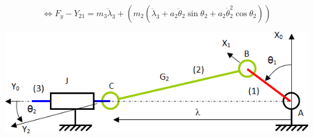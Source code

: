 \documentclass[10pt,fleqn]{article} %
\begin{document}
\begin{multicols}{2}
\begin{corrige}
\begin{itemize}
$$
\Longleftrightarrow
F_y-Y_{21}=m_3\ddot{\lambda}_3+\left(  m_2 \left(\ddot{\lambda}_3+a_2 \ddot{\theta}_2 \sin \theta_2+a_2 \dot{\theta}_2^2\cos\theta_2\right)\right)
$$
\end{itemize}


\end{corrige}
\else
\fi

\ifprof
\else
\end{multicols}
\fi

\begin{center}
\includegraphics[width=.7\linewidth]{images/fig_03}
\end{center}
\end{document}
